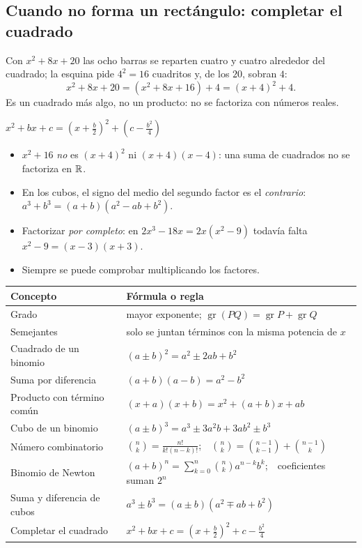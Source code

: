 \documentclass[11pt,a4paper]{article}
\begin{document}
\subsection{Cuando no forma un rectángulo: completar el cuadrado}
Con $x^2+8x+20$ las ocho barras se reparten cuatro y cuatro alrededor del cuadrado; la esquina pide $4^2=16$
cuadritos y, de los $20$, sobran $4$:
\[ x^2+8x+20=(x^2+8x+16)+4=(x+4)^2+4 . \]
Es un cuadrado más algo, no un producto: no se factoriza con números reales.
\begin{clavebox}
$\displaystyle x^2+bx+c=\left(x+\frac b2\right)^{2}+\left(c-\frac{b^2}{4}\right)$
\end{clavebox}
\begin{ojo}
\begin{itemize}
\item $x^2+16$ \emph{no} es $(x+4)^2$ ni $(x+4)(x-4)$: una suma de cuadrados no se factoriza en $\mathbb{R}$.
\item En los cubos, el signo del medio del segundo factor es el \emph{contrario}: $a^3+b^3=(a+b)(a^2-ab+b^2)$.
\item Factorizar \emph{por completo}: en $2x^3-18x=2x(x^2-9)$ todavía falta $x^2-9=(x-3)(x+3)$.
\item Siempre se puede comprobar multiplicando los factores.
\end{itemize}
\end{ojo}

\repaso
\begin{center}
\begin{tabularx}{\linewidth}{@{}l L@{}}
\toprule
Concepto & Fórmula o regla\\ \midrule
Grado & mayor exponente; $\operatorname{gr}(PQ)=\operatorname{gr}P+\operatorname{gr}Q$\\
Semejantes & solo se juntan términos con la misma potencia de $x$\\
Cuadrado de un binomio & $(a\pm b)^2=a^2\pm2ab+b^2$\\
Suma por diferencia & $(a+b)(a-b)=a^2-b^2$\\
Producto con término común & $(x+a)(x+b)=x^2+(a+b)x+ab$\\
Cubo de un binomio & $(a\pm b)^3=a^3\pm3a^2b+3ab^2\pm b^3$\\
Número combinatorio & $\binom nk=\frac{n!}{k!(n-k)!}$;\ \ $\binom nk=\binom{n-1}{k-1}+\binom{n-1}{k}$\\
Binomio de Newton & $(a+b)^n=\sum_{k=0}^{n}\binom nk a^{n-k}b^k$;\ \ coeficientes suman $2^n$\\
Suma y diferencia de cubos & $a^3\pm b^3=(a\pm b)(a^2\mp ab+b^2)$\\
Completar el cuadrado & $x^2+bx+c=\left(x+\frac b2\right)^2+c-\frac{b^2}{4}$\\
\bottomrule
\end{tabularx}
\end{center}
\end{document}
